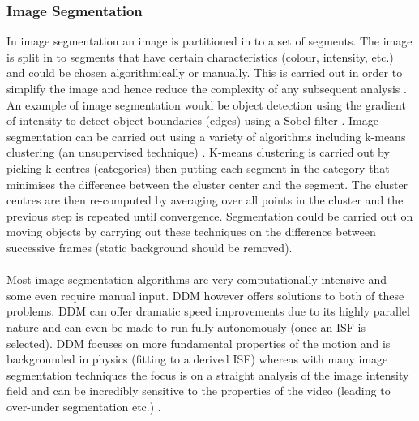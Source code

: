 \documentclass[10pt]{article}
\begin{document}
\subsubsection{Image Segmentation}
In image segmentation an image is partitioned in to a set of segments. The image is split in to segments that have certain characteristics (colour, intensity, etc.) and could be chosen algorithmically or manually. This is carried out in order to simplify the image and hence reduce the complexity of any subsequent analysis \cite{computer_vision_book}. An example of image segmentation would be object detection using the gradient of intensity to detect object boundaries (edges) using a Sobel filter \cite{sobel}. Image segmentation can be carried out using a variety of algorithms including k-means clustering (an unsupervised technique) \cite{segmentation_kmeans}. K-means clustering is carried out by picking k centres (categories) then putting each segment in the category that minimises the difference between the cluster center and the segment. The cluster centres are then re-computed by averaging over all points in the cluster and the previous step is repeated until convergence. Segmentation could be carried out on moving objects by carrying out these techniques on the difference between successive frames (static background should be removed).
\\\\
Most image segmentation algorithms are very computationally intensive and some even require manual input. DDM however offers solutions to both of these problems. DDM can offer dramatic speed improvements due to its highly parallel nature and can even be made to run fully autonomously (once an ISF is selected). DDM focuses on more fundamental properties of the motion and is backgrounded in physics (fitting to a derived ISF) whereas with many image segmentation techniques the focus is on a straight analysis of the image intensity field and can be incredibly sensitive to the properties of the video (leading to over-under segmentation etc.) \cite{computer_vision_book}. 
\end{document}
